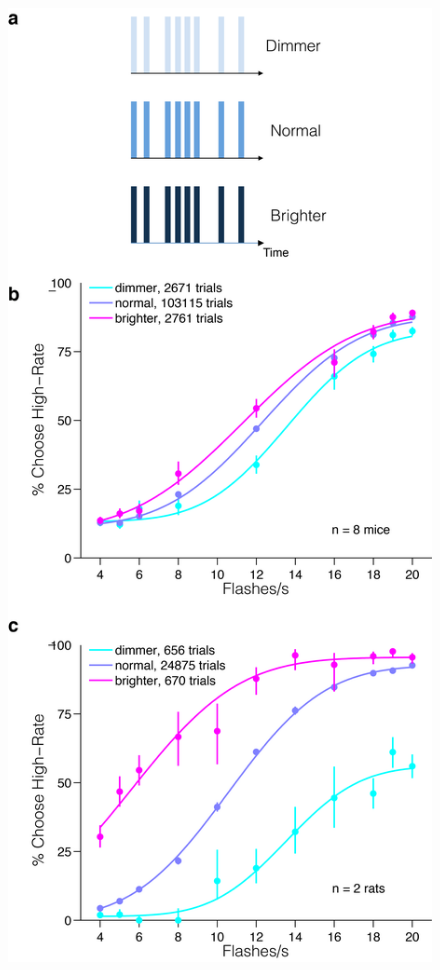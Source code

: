\begin{figure}
  \centering
  	\includegraphics[width=\textwidth,height=0.8\textheight,keepaspectratio]{Figures/chapter2/brightness_manipulation_1.png}

\end{figure}
